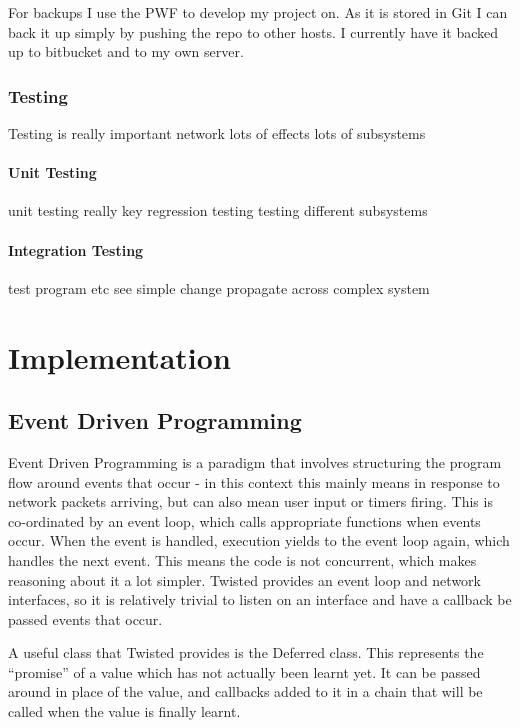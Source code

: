 \documentclass[12pt,twoside,notitlepage]{report}
\begin{document}
For backups I use the PWF to develop my project on. As it is stored in Git I can back it up simply
by pushing the repo to other hosts. I currently have it backed up to bitbucket and to my own
server.

\subsection{Testing}

Testing is really important
network
lots of effects
lots of subsystems

\subsubsection{Unit Testing}

unit testing really key
regression testing
testing different subsystems

\subsubsection{Integration Testing}

test program etc
see simple change propagate across complex system



\cleardoublepage
\chapter{Implementation}

\section{Event Driven Programming}

Event Driven Programming is a paradigm that involves structuring the program flow around events
that occur - in this context this mainly means in response to network packets arriving, but can
also mean user input or timers firing. This is co-ordinated by an event loop, which calls
appropriate functions when events occur. When the event is handled, execution yields to the event
loop again, which handles the next event. This means the code is not concurrent, which makes
reasoning about it a lot simpler. Twisted provides an event loop and network interfaces, so it is
relatively trivial to listen on an interface and have a callback be passed events that occur.

A useful class that Twisted provides is the Deferred class. This represents the ``promise'' of a
value which has not actually been learnt yet. It can be passed around in place of the value, and
callbacks added to it in a chain that will be called when the value is finally learnt.
\end{document}
